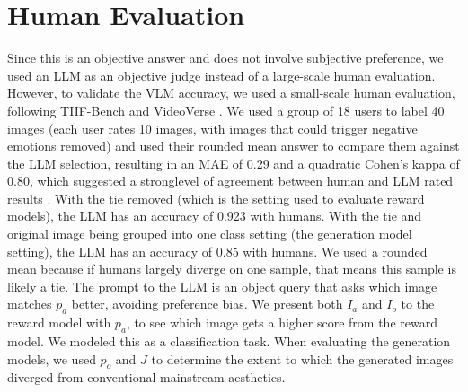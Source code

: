 \appendix
\clearpage

\section{Human Evaluation}
\label{sec:human_eval}
Since this is an objective answer and does not involve subjective preference, we used an LLM as an objective judge instead of a large-scale human evaluation. However, to validate the VLM accuracy, we used a small-scale human evaluation, following TIIF-Bench \cite{wei_tiif-bench_2025} and VideoVerse \cite{wang_videoverse_2025}. We used a group of 18 users to label 40 images (each user rates 10 images, with images that could trigger negative emotions removed) and used their rounded mean answer to compare them against the LLM selection, resulting in an MAE of 0.29 and a quadratic Cohen's kappa of 0.80, which suggested a stronglevel of agreement between human and LLM rated results \cite{mchugh_interrater_2012}. With the tie removed (which is the setting used to evaluate reward models), the LLM has an accuracy of 0.923 with humans. With the tie and original image being grouped into one class setting (the generation model setting), the LLM has an accuracy of 0.85 with humans. We used a rounded mean because if humans largely diverge on one sample, that means this sample is likely a tie. The prompt to the LLM is an object query that asks which image matches $p_a$ better, avoiding preference bias. We present both $I_a$ and $I_o$ to the reward model with $p_a$, to see which image gets a higher score from the reward model. We modeled this as a classification task. When evaluating the generation models, we used $p_o$ and $J$ to determine the extent to which the generated images diverged from conventional mainstream aesthetics.

